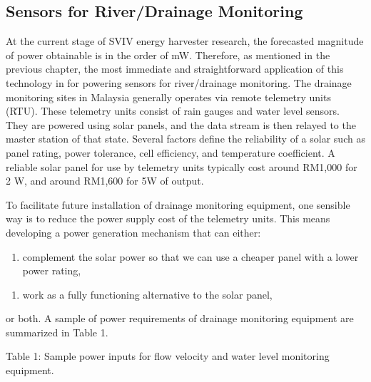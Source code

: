 \documentclass[]{article}
\begin{document}
\subsection{\texorpdfstring{\protect\hypertarget{_Ref520288997}{}{\protect\hypertarget{_Toc41048801}{}{}}Sensors
for River/Drainage
Monitoring}{Sensors for River/Drainage Monitoring}}\label{sensors-for-riverdrainage-monitoring}

At the current stage of SVIV energy harvester research, the forecasted
magnitude of power obtainable is in the order of mW. Therefore, as
mentioned in the previous chapter, the most immediate and
straightforward application of this technology in for powering sensors
for river/drainage monitoring. The drainage monitoring sites in Malaysia
generally operates via remote telemetry units (RTU). These telemetry
units consist of rain gauges and water level sensors. They are powered
using solar panels, and the data stream is then relayed to the master
station of that state. Several factors define the reliability of a solar
such as panel rating, power tolerance, cell efficiency, and temperature
coefficient. A reliable solar panel for use by telemetry units typically
cost around RM1,000 for 2 W, and around RM1,600 for 5W of output.

To facilitate future installation of drainage monitoring equipment, one
sensible way is to reduce the power supply cost of the telemetry units.
This means developing a power generation mechanism that can either:

\begin{enumerate}
\def\labelenumi{\roman{enumi})}
\item
  complement the solar power so that we can use a cheaper panel with a
  lower power rating,
\end{enumerate}

\begin{enumerate}
\def\labelenumi{\roman{enumi})}
\item
  work as a fully functioning alternative to the solar panel,
\end{enumerate}

or both. A sample of power requirements of drainage monitoring equipment
are summarized in Table 1.

\protect\hypertarget{_Ref500253149}{}{\protect\hypertarget{_Ref500253126}{}{\protect\hypertarget{_Toc520543710}{}{\protect\hypertarget{_Toc520545591}{}{\protect\hypertarget{_Toc12528554}{}{\protect\hypertarget{_Toc40994423}{}{}}}}}}Table
1: Sample power inputs for flow velocity and water level monitoring
equipment.
\end{document}
